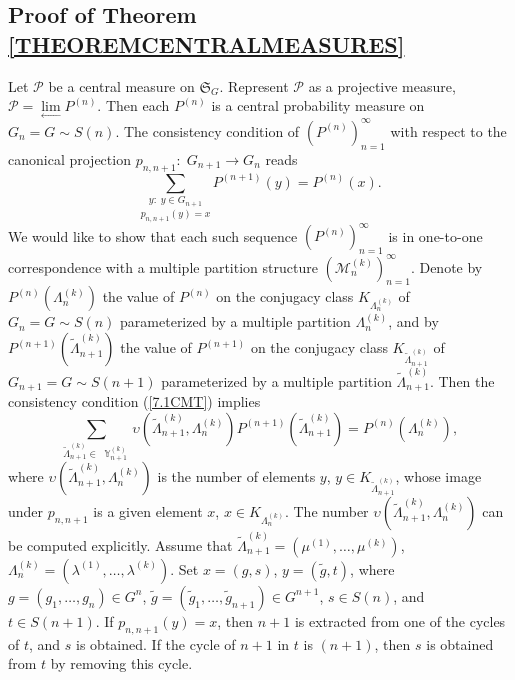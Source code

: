 \documentclass[12pt]{amsart}
\theoremstyle{definition}
\numberwithin{equation}{section}
\DeclareMathOperator{\Y}{\mathbb{Y}}
\newcommand{\tLambda}{\widetilde{\Lambda}}
\begin{document}
\subsection{Proof of Theorem \ref{THEOREMCENTRALMEASURES}}\label{SUBSECTIONPR}
Let $\mathcal{P}$ be a central measure on $\mathfrak{S}_{G}$. Represent $\mathcal{P}$ as a projective measure, $\mathcal{P}=\underset{\longleftarrow}{\lim}P^{(n)}$. Then each $P^{(n)}$ is a central probability measure on $G_n=G\sim S(n)$. The consistency condition of $\left(P^{(n)}\right)_{n=1}^{\infty}$ with respect to the canonical projection $p_{n,n+1}:\; G_{n+1}\longrightarrow G_n$ reads
\begin{equation}\label{7.1CMT}
\underset{p_{n,n+1}(y)=x}{\sum\limits_{y:\;y\in G_{n+1}}}P^{(n+1)}(y)=P^{(n)}(x).
\end{equation}
We would like to show that each such sequence $\left(P^{(n)}\right)_{n=1}^{\infty}$ is in one-to-one correspondence with a multiple partition structure $\left(\mathcal{M}_n^{(k)}\right)_{n=1}^{\infty}$.
Denote by $P^{(n)}\left(\Lambda_n^{(k)}\right)$ the value of $P^{(n)}$ on the conjugacy class $K_{\Lambda_n^{(k)}}$ of $G_n=G\sim S(n)$ parameterized by a multiple partition $\Lambda_n^{(k)}$, and by
$P^{(n+1)}\left(\tLambda_{n+1}^{(k)}\right)$ the value of $P^{(n+1)}$ on the conjugacy class
$K_{\tLambda_{n+1}^{(k)}}$ of $G_{n+1}=G\sim S(n+1)$ parameterized by  a multiple partition
$\tLambda_{n+1}^{(k)}$. Then the consistency condition (\ref{7.1CMT}) implies
\begin{equation}\label{7.2CMT}
\sum\limits_{\tLambda_{n+1}^{(k)}\in\;\Y_{n+1}^{(k)}}\upsilon\left(\tLambda_{n+1}^{(k)},\Lambda_n^{(k)}\right)
P^{(n+1)}\left(\tLambda_{n+1}^{(k)}\right)=P^{(n)}\left(\Lambda_n^{(k)}\right),
\end{equation}
where $\upsilon\left(\tLambda_{n+1}^{(k)},\Lambda_n^{(k)}\right)$ is the number of  elements $y$,
$y\in K_{\tLambda_{n+1}^{(k)}}$, whose image under $p_{n,n+1}$ is a given element $x$, $x\in K_{\Lambda_n^{(k)}}$. The number $\upsilon\left(\tLambda_{n+1}^{(k)},\Lambda_n^{(k)}\right)$ can be computed explicitly. Assume that $\tLambda_{n+1}^{(k)}=\left(\mu^{(1)},\ldots,\mu^{(k)}\right)$, $\Lambda_n^{(k)}=\left(\lambda^{(1)},\ldots,\lambda^{(k)}\right)$.
Set $x=(g,s)$, $y=(\tilde{g},t)$, where
$g=\left(g_1,\ldots,g_n\right)\in G^n$, $\tilde{g}=\left(\tilde{g}_1,\ldots,\tilde{g}_{n+1}\right)\in G^{n+1}$,
$s\in S(n)$, and $t\in S(n+1)$. If $p_{n,n+1}(y)=x$, then $n+1$ is extracted from one of the cycles of $t$, and $s$ is obtained.  If the cycle of $n+1$ in $t$ is $(n+1)$, then $s$ is obtained from $t$ by removing this cycle.
\end{document}
